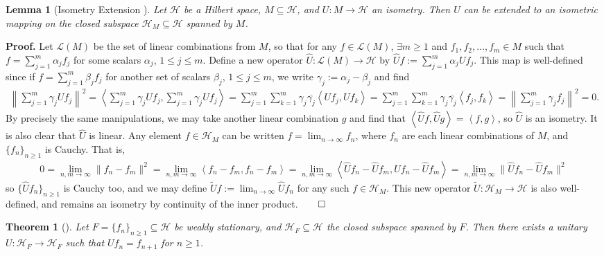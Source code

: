 \documentclass[11pt]{report}
\newcommand{\mc}[1]{\mathcal{#1}}
\newcommand{\ip}[2]{\left\langle#1,#2\right\rangle }
\newcommand{\1}[1]{\mathbbm{1}_{\{#1\}}}
\newtheorem{theorem}{Theorem}[section]
\newtheorem{lemma}{Lemma}[section]
\theoremstyle{definition}
\begin{document}
    \begin{lemma}[Isometry Extension {\cite[lemma 2.1.2]{Weber_2000}}]\label{lem5}
        Let $\mc{H}$ be a Hilbert space, $M\subseteq\mc{H}$, and
        $U:M\rightarrow\mc{H}$ an isometry. Then $U$ can be extended to an
        isometric mapping on the closed subspace $\mc{H}_M\subseteq\mc{H}$
        spanned by $M$.  
    \end{lemma}
    \noindent\textbf{Proof.} Let $\mc{L}(M)$ be the set of linear combinations
    from $M$, so that for any $f\in\mc{L}(M)$, $\exists m\geq 1$ and
    $f_1,f_2,\dots,f_m\in M$ such that $f=\sum_{j=1}^m\alpha_j f_j$ for some
    scalars $\alpha_j$, $1\leq j\leq m$. Define a new operator
    $\hat{U}:\mc{L}(M)\rightarrow\mc{H}$ by
    $\hat{U}f:=\sum_{j=1}^m\alpha_jUf_j$. This map is well-defined since if
    $f=\sum_{j=1}^m\beta_jf_j$ for another set of scalars $\beta_j$, $1\leq
    j\leq m$, we write $\gamma_j:=\alpha_j-\beta_j$ and find
    \begin{align*}
        \left\|\sum_{j=1}^m\gamma_jUf_j\right\|^2=\ip{\sum_{j=1}^m\gamma_jUf_j}{\sum_{j=1}^m\gamma_jUf_j}=\sum_{j=1}^m\sum_{k=1}^m\gamma_j\overline{\gamma_j}\ip{Uf_j}{Uf_k}=\sum_{j=1}^m\sum_{k=1}^m\gamma_j\overline{\gamma_j}\ip{f_j}{f_k}=\left\|\sum_{j=1}^m\gamma_jf_j\right\|^2=0.
    \end{align*}
    By precisely the same manipulations, we may take another linear combination
    $g$ and find that $\ip{\hat{U}f}{\hat{U}g}=\ip{f}{g}$, so $\hat{U}$ is an
    isometry. It is also clear that $\hat{U}$ is linear. Any element
    $f\in\mc{H}_M$ can be written $f=\lim_{n\rightarrow\infty}f_n$, where $f_n$
    are each linear combinations of $M$, and $\{f_n\}_{n\geq 1}$ is Cauchy. That
    is,
    \begin{align*}
        0=\lim_{n,m\rightarrow\infty}\|f_n-f_m\|^2=\lim_{n,m\rightarrow\infty}\ip{f_n-f_m}{f_n-f_m}=\lim_{n,m\rightarrow\infty}\ip{\hat{U}f_n-\hat{U}f_m}{\hat{U}f_n-\hat{U}f_m}=\lim_{n,m\rightarrow\infty}\|\hat{U}f_n-\hat{U}f_m\|^2
    \end{align*}
    so $\{\hat{U}f_n\}_{n\geq 1}$ is Cauchy too, and we may define
    $\widetilde{U}f:=\lim_{n\rightarrow\infty}\hat{U}f_n$ for any such
    $f\in\mc{H}_M$. This new operator $\widetilde{U}:\mc{H}_M\rightarrow\mc{H}$
    is also well-defined, and remains an isometry by continuity of the inner
    product.\hfill{$\qed$}
    \begin{theorem}[{\cite[theorem 2.1.3]{Weber_2000}}]\label{thm2} Let
        $F=\{f_n\}_{n\geq 1}\subseteq\mc{H}$ be weakly stationary, and
        $\mc{H}_F\subseteq\mc{H}$ the closed subspace spanned by $F$. Then there
        exists a unitary $U:\mc{H}_F\rightarrow\mc{H}_F$ such that
        $Uf_n=f_{n+1}$ for $n\geq 1$.
    \end{theorem}
\end{document}
